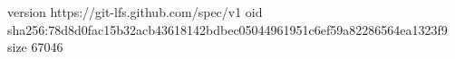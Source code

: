 version https://git-lfs.github.com/spec/v1
oid sha256:78d8d0fac15b32acb43618142bdbec05044961951c6ef59a82286564ea1323f9
size 67046
